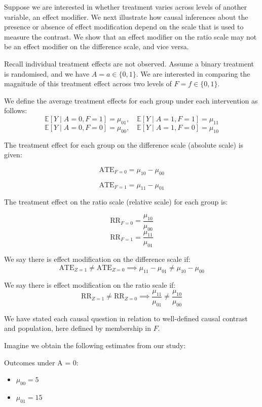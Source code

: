 \documentclass[
  single column]{article}
\providecommand{\tightlist}{%
  \setlength{\itemsep}{0pt}\setlength{\parskip}{0pt}}\usepackage{longtable,booktabs,array}
\begin{document}
Suppose we are interested in whether treatment varies across levels of
another variable, an effect modifier. We next illustrate how causal
inferences about the presence or absence of effect modification depend
on the scale that is used to measure the contrast. We show that an
effect modifier on the ratio scale may not be an effect modifier on the
difference scale, and vice versa.

Recall individual treatment effects are not observed. Assume a binary
treatment is randomised, and we have \(A = a \in \{0,1\}\). We are
interested in comparing the magnitude of this treatment effect across
two levels of \(F = f \in \{0,1\}\).

We define the average treatment effects for each group under each
intervention as follows: \[
\mathbb{E}[Y \mid A = 0, F = 1] = \mu_{01}, \quad \mathbb{E}[Y \mid  A = 1, F = 1] = \mu_{11}
\] \[
\mathbb{E}[Y \mid  A = 0, F = 0] = \mu_{00}, \quad \mathbb{E}[Y \mid A = 1, F = 0] = \mu_{10}
\]

The treatment effect for each group on the difference scale (absolute
scale) is given:

\[
\text{ATE}_{F = 0} = \mu_{10} - \mu_{00}
\]

\[
\text{ATE}_{F = 1} = \mu_{11} - \mu_{01}
\]

The treatment effect on the ratio scale (relative scale) for each group
is:

\[
\text{RR}_{F = 0} = \frac{\mu_{10}}{\mu_{00}}
\] \[
\text{RR}_{F = 1} = \frac{\mu_{11}}{\mu_{01}}
\]

We say there is effect modification on the difference scale if: \[
\text{ATE}_{Z = 1} \neq \text{ATE}_{Z = 0} \implies \mu_{11} - \mu_{01} \neq \mu_{10} - \mu_{00}
\]

We say there is effect modification on the ratio scale if: \[
\text{RR}_{Z = 1} \neq \text{RR}_{Z = 0} \implies \frac{\mu_{11}}{\mu_{01}} \neq \frac{\mu_{10}}{\mu_{00}}
\]

We have stated each causal question in relation to well-defined causal
contrast and population, here defined by membership in \(F\).

Imagine we obtain the following estimates from our study:

Outcomes under A = 0:

\begin{itemize}
\tightlist
\item
  \(\mu_{00} = 5\)
\item
  \(\mu_{01} = 15\)
\end{itemize}
\end{document}
